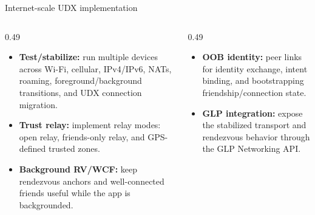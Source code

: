 \begin{frame}{Internet-scale UDX implementation}
\centering
{}

\vspace{0.25em}
\begin{columns}[T,totalwidth=\textwidth]
\begin{column}{0.49\textwidth}
\tiny
\begin{itemize}
  \setlength\itemsep{0.12em}
  \item \textbf{Test/stabilize:} run multiple devices across Wi-Fi, cellular, IPv4/IPv6, NATs, roaming, foreground/background transitions, and UDX connection migration.
  \item \textbf{Trust relay:} implement relay modes: open relay, friends-only relay, and GPS-defined trusted zones.
  \item \textbf{Background RV/WCF:} keep rendezvous anchors and well-connected friends useful while the app is backgrounded.
\end{itemize}
\end{column}
\begin{column}{0.49\textwidth}
\tiny
\begin{itemize}
  \setlength\itemsep{0.12em}
  \item \textbf{OOB identity:} peer links for identity exchange, intent binding, and bootstrapping friendship/connection state.
  \item \textbf{GLP integration:} expose the stabilized transport and rendezvous behavior through the GLP Networking API.
\end{itemize}
\end{column}
\end{columns}

\vspace{0.15em}
\end{frame}

